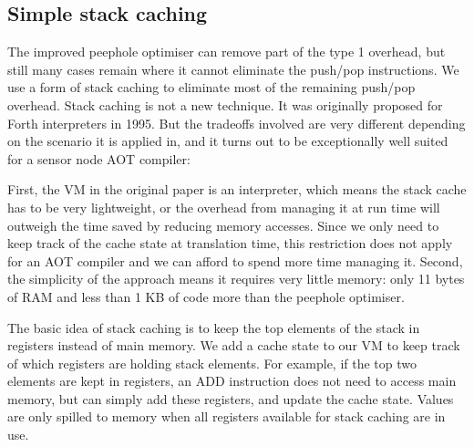 
\subsection{Simple stack caching}
\label{sec-optimisations-simple-stack-caching}

The improved peephole optimiser can remove part of the type 1 overhead, but still many cases remain where it cannot eliminate the push/pop instructions. We use a form of stack caching \cite{Ertl:1995dv} to eliminate most of the remaining push/pop overhead. Stack caching is not a new technique. It was originally proposed for Forth interpreters in 1995. But the tradeoffs involved are very different depending on the scenario it is applied in, and it turns out to be exceptionally well suited for a sensor node AOT compiler:

First, the VM in the original paper is an interpreter, which means the stack cache has to be very lightweight, or the overhead from managing it at run time will outweigh the time saved by reducing memory accesses. Since we only need to keep track of the cache state at translation time, this restriction does not apply for an AOT compiler and we can afford to spend more time managing it. Second, the simplicity of the approach means it requires very little memory: only 11 bytes of RAM and less than 1 KB of code more than the peephole optimiser.

The basic idea of stack caching is to keep the top elements of the stack in registers instead of main memory. We add a cache state to our VM to keep track of which registers are holding stack elements. For example, if the top two elements are kept in registers, an ADD instruction does not need to access main memory, but can simply add these registers, and update the cache state. Values are only spilled to memory when all registers available for stack caching are in use.

